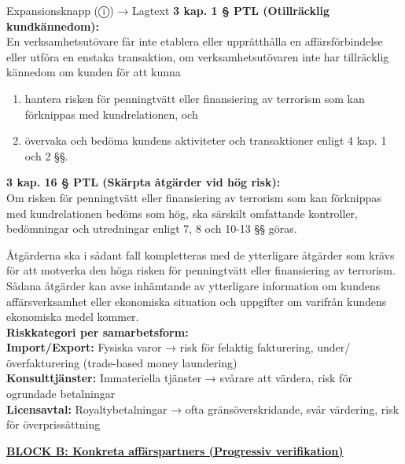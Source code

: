 \documentclass[10pt]{beamer}
\begin{document}
\begin{frame}[label=riskfragor-steg2]
\begin{alertblock}{Expansionsknapp (ⓘ) → Lagtext}
    \tiny \textbf{3 kap. 1 § PTL (Otillräcklig kundkännedom):}\\
    \tiny En verksamhetsutövare får inte etablera eller upprätthålla en affärsförbindelse eller utföra 
    en enstaka transaktion, om verksamhetsutövaren inte har tillräcklig kännedom om kunden för att kunna
    \begin{enumerate}
      \item hantera risken för penningtvätt eller finansiering av terrorism som kan förknippas med 
      kundrelationen, och
      \item övervaka och bedöma kundens aktiviteter och transaktioner enligt 4 kap. 1 och 2 §§.
    \end{enumerate}
    \vspace{0.1cm}
    
    \tiny \textbf{3 kap. 16 § PTL (Skärpta åtgärder vid hög risk):}\\
    \tiny Om risken för penningtvätt eller finansiering av terrorism som kan förknippas med kundrelationen 
    bedöms som hög, ska särskilt omfattande kontroller, bedömningar och utredningar enligt 7, 8 och 10-13 §§ 
    göras.
    
    \tiny Åtgärderna ska i sådant fall kompletteras med de ytterligare åtgärder som krävs för att motverka 
    den höga risken för penningtvätt eller finansiering av terrorism. Sådana åtgärder kan avse inhämtande 
    av ytterligare information om kundens affärsverksamhet eller ekonomiska situation och uppgifter om 
    varifrån kundens ekonomiska medel kommer.\\[0.1cm]
    
    \tiny \textbf{Riskkategori per samarbetsform:}\\
    \tiny \textbf{Import/Export:} Fysiska varor → risk för felaktig fakturering, under/överfakturering 
    (trade-based money laundering)\\
    \tiny \textbf{Konsulttjänster:} Immateriella tjänster → svårare att värdera, risk för ogrundade betalningar\\
    \tiny \textbf{Licensavtal:} Royaltybetalningar → ofta gränsöverskridande, svår värdering, risk för 
    överprissättning\\[0.1cm]
  \end{alertblock}

  \vspace{0.4cm}

  \textbf{\underline{BLOCK B: Konkreta affärspartners (Progressiv verifikation)}}


\end{frame}
\end{document}
